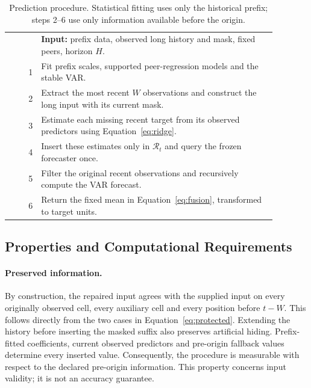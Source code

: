 \begin{table}[t]
\caption{Prediction procedure. Statistical fitting uses only the historical prefix; steps 2--6 use only information available before the origin.}
\label{alg:procedure}
\centering\small
\begin{tabular}{r p{0.88\linewidth}}
\toprule
 & \textbf{Input:} prefix data, observed long history and mask, fixed peers, horizon $H$.\\
1 & Fit prefix scales, supported peer-regression models and the stable VAR.\\
2 & Extract the most recent $W$ observations and construct the long input with its current mask.\\
3 & Estimate each missing recent target from its observed predictors using Equation~\ref{eq:ridge}.\\
4 & Insert these estimates only in $\mathcal R_t$ and query the frozen forecaster once.\\
5 & Filter the original recent observations and recursively compute the VAR forecast.\\
6 & Return the fixed mean in Equation~\ref{eq:fusion}, transformed to target units.\\
\bottomrule
\end{tabular}
\end{table}

\subsection{Properties and Computational Requirements}
\label{sec:properties}

\paragraph{Preserved information.}
By construction, the repaired input agrees with the supplied input on every originally observed cell, every auxiliary cell and every position before $t-W$. This follows directly from the two cases in Equation~\ref{eq:protected}. Extending the history before inserting the masked suffix also preserves artificial hiding. Prefix-fitted coefficients, current observed predictors and pre-origin fallback values determine every inserted value. Consequently, the procedure is measurable with respect to the declared pre-origin information. This property concerns input validity; it is not an accuracy guarantee.

